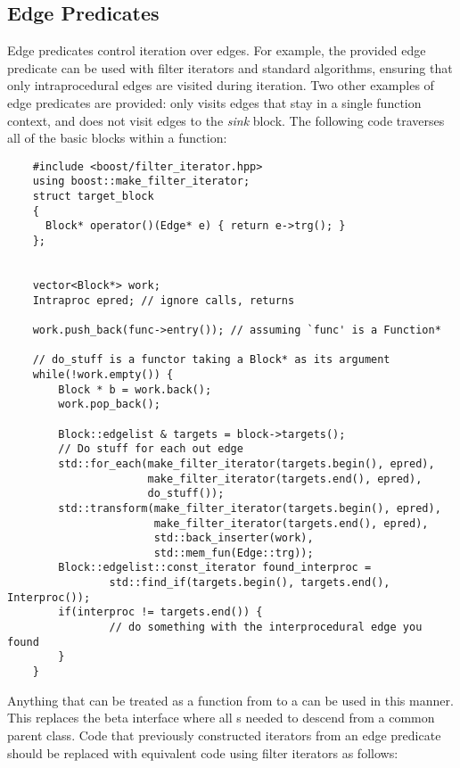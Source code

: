 \subsection{Edge Predicates}
\label{sec:pred}


Edge predicates control iteration over edges. For example, the provided
 edge predicate can be used with filter iterators and standard
algorithms, ensuring that only intraprocedural edges are visited during
iteration. Two other examples of edge predicates are provided: 
 only visits edges that stay in a single
function context, and  does not visit edges to 
the \emph{sink} block.  The following code traverses 
all of the basic blocks within a
function:

\lstset{numbers=left, numberstyle=\tiny, stepnumber=5, numbersep=5pt}
\begin{lstlisting}
    #include <boost/filter_iterator.hpp>
    using boost::make_filter_iterator;
    struct target_block
    {
      Block* operator()(Edge* e) { return e->trg(); }
    };


    vector<Block*> work;
    Intraproc epred; // ignore calls, returns
   
    work.push_back(func->entry()); // assuming `func' is a Function*

    // do_stuff is a functor taking a Block* as its argument
    while(!work.empty()) {
        Block * b = work.back();
        work.pop_back();

        Block::edgelist & targets = block->targets();
        // Do stuff for each out edge
        std::for_each(make_filter_iterator(targets.begin(), epred), 
                      make_filter_iterator(targets.end(), epred),
                      do_stuff());
        std::transform(make_filter_iterator(targets.begin(), epred),
                       make_filter_iterator(targets.end(), epred), 
                       std::back_inserter(work), 
                       std::mem_fun(Edge::trg));
        Block::edgelist::const_iterator found_interproc =
                std::find_if(targets.begin(), targets.end(), Interproc());
        if(interproc != targets.end()) {
                // do something with the interprocedural edge you found
        }
    }

\end{lstlisting}

Anything that can be treated as a function from  to a  can be used in this manner. This replaces the beta interface where all
s needed to descend from a common parent class. Code that previously constructed iterators from an edge predicate should be replaced
with equivalent code using filter iterators as follows:

